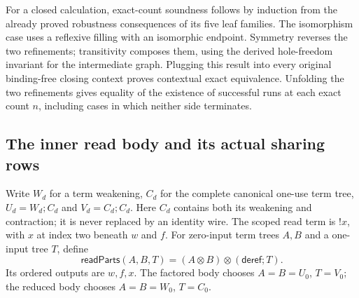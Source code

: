 For a closed calculation, exact-count soundness follows by induction from
the already proved robustness consequences of its five leaf families.
The isomorphism case uses a reflexive filling with an isomorphic endpoint.
Symmetry reverses the two refinements; transitivity composes them, using
the derived hole-freedom invariant for the intermediate graph. Plugging
this result into every original binding-free closing context proves
contextual exact equivalence. Unfolding the two refinements gives equality
of the existence of successful runs at each exact count $n$, including
cases in which neither side terminates.

\subsection{The inner read body and its actual sharing rows}
Write $W_d$ for a term weakening, $C_d$ for the complete canonical one-use
term tree, $U_d=W_d;C_d$ and $V_d=C_d;C_d$. Here $C_d$ contains both its
weakening and contraction; it is never replaced by an identity wire.
The scoped read term is $!x$, with $x$ at index two beneath $w$ and $f$.
For zero-input term trees $A,B$ and a one-input tree $T$, define
\[
 \mathsf{readParts}(A,B,T)=(A\otimes B)\otimes(\mathsf{deref};T).
\]
Its ordered outputs are $w,f,x$. The factored body chooses $A=B=U_0$,
$T=V_0$; the reduced body chooses $A=B=W_0$, $T=C_0$.

